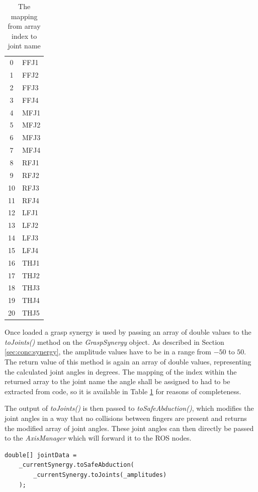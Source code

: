 \begin{table}
	\caption{\label{tab:impl:indexjoints}The mapping from array index to joint name}
	\begin{tabular}{|c|l|}
		\hline
		0 & FFJ1 \\
		1 & FFJ2 \\
		2 & FFJ3 \\
		3 & FFJ4 \\
		4 & MFJ1 \\
		5 & MFJ2 \\
		6 & MFJ3 \\
		7 & MFJ4 \\
		8 & RFJ1 \\
		9 & RFJ2 \\
		10 & RFJ3 \\
		11 & RFJ4 \\
		12 & LFJ1\\
		13 & LFJ2\\
		14 & LFJ3\\
		15 & LFJ4\\
		16 & THJ1\\
		17 & THJ2\\
		18 & THJ3\\
		19 & THJ4\\
		20 & THJ5 \\
		\hline
	\end{tabular}
\end{table}

Once loaded a grasp synergy is used by passing an array of double values to the \textit{toJoints()} method on the \textit{GraspSynergy} object. As described in Section \ref{sec:conc:synergy}, the amplitude values have to be in a range from $-50$ to $50$. The return value of this method is again an array of double values, representing the calculated joint angles in degrees. The mapping of the index within the returned array to the joint name the angle shall be assigned to had to be extracted from code, so it is available in Table \ref{tab:impl:indexjoints} for reasons of completeness. 

The output of \textit{toJoints()} is then passed to \textit{toSafeAbduction()}, which modifies the joint angles in a way that no collisions between fingers are present and returns the modified array of joint angles. These joint angles can then directly be passed to the \textit{AxisManager} which will forward it to the ROS nodes.

\begin{lstlisting}[caption={Example call of toJoints() and toSafeAbduction()}]
double[] jointData =
	_currentSynergy.toSafeAbduction(
		_currentSynergy.toJoints(_amplitudes)
	);
\end{lstlisting}

